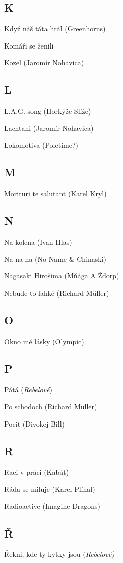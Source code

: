 \begin{multicols}{2}
\subsection*{K}
Když náš táta hrál (Greenhorns)

Komáři se ženili

Kozel (Jaromír Nohavica)

\subsection*{L}
L.A.G. song (Horkýže Slíže)

Lachtani (Jaromír Nohavica)

Lokomotiva (Poletíme?)

\subsection*{M}
Morituri te salutant (Karel Kryl)

\subsection*{N}
Na kolena (Ivan Hlas)

Na na na (No Name \& Chinaski)

Nagasaki Hirošima (Mňága A Žďorp)

Nebude to ľahké (Richard Müller)

\subsection*{O}
Okno mé lásky (Olympic)

\subsection*{P}
Pátá (\emph{Rebelové})

Po schodoch (Richard Müller)

Pocit (Divokej Bill)

\subsection*{R}
Raci v práci (Kabát)

Ráda se miluje (Karel Plíhal)

Radioactive (Imagine Dragons)

\subsection*{Ř}
Řekni, kde ty kytky jsou (\emph{Rebelové)}


\end{multicols}


